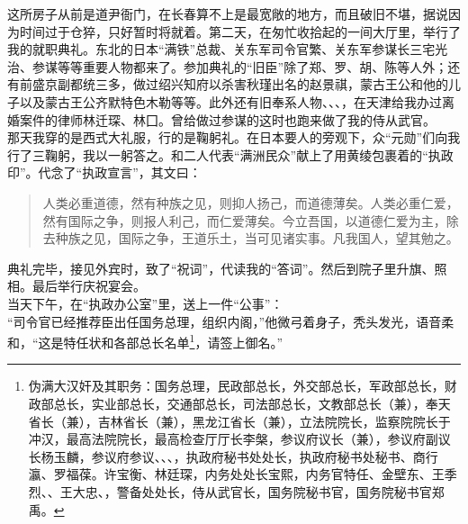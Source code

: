 这所房子从前是道尹衙门，在长春算不上是最宽敞的地方，而且破旧不堪，据说因为时间过于仓猝，只好暂时将就着。第二天，在匆忙收拾起的一间大厅里，举行了我的就职典礼。东北的日本“满铁”总裁、关东军司令官繁、关东军参谋长三宅光治、参谋等等重要人物都来了。参加典礼的“旧臣”除了郑、罗、胡、陈等人外；还有前盛京副都统三多，做过绍兴知府以杀害秋瑾出名的赵景祺，蒙古王公和他的儿子以及蒙古王公齐默特色木勒等等。此外还有旧奉系人物、、、，在天津给我办过离婚案件的律师林迁琛、林囗。曾给做过参谋的这时也跑来做了我的侍从武官。\\

那天我穿的是西式大礼服，行的是鞠躬礼。在日本要人的旁观下，众“元勋”们向我行了三鞠躬，我以一躬答之。和二人代表“满洲民众”献上了用黄绫包裹着的“执政印”。代念了“执政宣言”，其文曰：\\

\begin{quote}
	人类必重道德，然有种族之见，则抑人扬己，而道德薄矣。人类必重仁爱，然有国际之争，则报人利己，而仁爱薄矣。今立吾国，以道德仁爱为主，除去种族之见，国际之争，王道乐土，当可见诸实事。凡我国人，望其勉之。\\
\end{quote}

典礼完毕，接见外宾时，致了“祝词”，代读我的“答词”。然后到院子里升旗、照相。最后举行庆祝宴会。\\

当天下午，在“执政办公室”里，送上一件“公事”：\\

“司令官已经推荐臣出任国务总理，组织内阁，”他微弓着身子，秃头发光，语音柔和，“这是特任状和各部总长名单\footnote{伪满大汉奸及其职务：国务总理，民政部总长，外交部总长，军政部总长，财政部总长，实业部总长，交通部总长，司法部总长，文教部总长（兼），奉天省长（兼），吉林省长（兼），黑龙江省长（兼），立法院院长，监察院院长于冲汉，最高法院院长，最高检查厅厅长李槃，参议府议长（兼），参议府副议长杨玉麟，参议府参议、、、，执政府秘书处处长，执政府秘书处秘书、商行瀛、罗福葆。许宝衡、林廷琛，内务处处长宝熙，内务官特任、金壁东、王季烈、、王大忠、，警备处处长，侍从武官长，国务院秘书官，国务院秘书官郑禹。}，请签上御名。”\\

